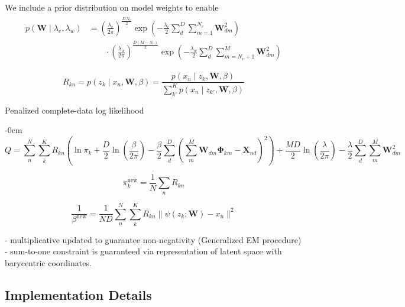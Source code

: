 \documentclass[remotesensing,article,submit,pdftex,moreauthors]{Definitions/mdpi}
\begin{document}
We include a prior distribution on model weights to enable
\begin{align}\label{eq:weight-prior}
\begin{split}
    p(\mathbf{W} \mid \lambda_e, \lambda_w) &= \left(\frac{\lambda_e}{2\pi}\right)^{\frac{D\,N_v}{2}}\exp\left(-\frac{\lambda_e}{2}\sum\limits_d^D\sum\limits_{m=1}^{N_v}\mathbf{W}_{dm}^2 \right)\\ 
    & \qquad \cdot \left(\frac{\lambda_w}{2\pi}\right)^{\frac{D(M-N_v)}{2}}\exp\left(-\frac{\lambda_w}{2}\sum\limits_d^D\sum_{m=N_v+1}^M \mathbf{W}_{dm}^2\right)
\end{split}
\end{align}

\begin{equation}\label{eq:responsibility}
    R_{kn}  = p(z_k \mid x_n, \mathbf{W}, \beta) = \dfrac{p(x_n \mid z_k, \mathbf{W}, \beta)}{\sum\limits_{k'}^K p(x_n \mid z_{k'}, \mathbf{W}, \beta)}
\end{equation}

Penalized complete-data log likelihood
\begin{adjustwidth}{-\extralength}{0cm}
\begin{equation}\label{eq:complete-data-llh}
    Q = \sum\limits_n^N\sum\limits_k^K R_{kn} \left(\ln\pi_k + \frac{D}{2}\ln\left(\frac{\beta}{2\pi}\right) - \frac{\beta}{2}\sum\limits_d^D\left(\sum\limits_m^M \mathbf{W}_{dm}\mathbf{\Phi}_{km} - \mathbf{X}_{nd}\right)^2\right) + \frac{MD}{2}\ln\left(\frac{\lambda}{2\pi}\right) - \frac{\lambda}{2}\sum\limits_d^D \sum\limits_m^M \mathbf{W}_{dm}^2
\end{equation}
\end{adjustwidth}


\begin{equation}\label{eq:pi-update}
    \pi_k^{\text{new}}  = \frac{1}{N}\sum_n R_{kn}
\end{equation}

\begin{equation}\label{eq:beta-update}
    \frac{1}{\beta^{\text{new}}}  = \frac{1}{ND}\sum\limits_n^N\sum\limits_k^K R_{kn}\lVert \psi(z_k; \mathbf{W}) - x_n \rVert^2
\end{equation}

- multiplicative updated to guarantee non-negativity (Generalized EM procedure)
- sum-to-one constraint is guaranteed via representation of latent space with barycentric coordinates.

\subsection{Implementation Details}
\end{document}
